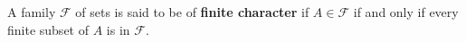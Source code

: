 A family \(\mathcal{F}\) of sets is said to be of \textbf{finite character} if \(A \in \mathcal{F}\) if and only if every finite subset of \(A\) is in \(\mathcal{F}\).